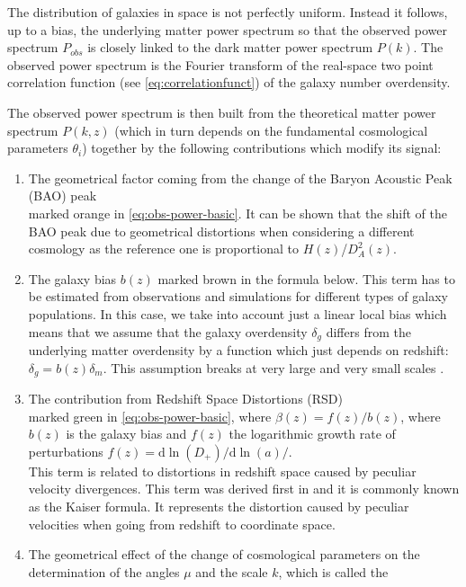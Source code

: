 The distribution of galaxies in space is not perfectly uniform. Instead it follows, up to a bias, the underlying
matter power spectrum so that the observed power spectrum $P_{obs}$ 
is closely linked to the dark matter power spectrum $P(k)$. The observed
power spectrum is the Fourier transform of the real-space two point correlation
function (see \cref{eq:correlationfunct}) of the galaxy number overdensity.

The observed power spectrum is then built from the theoretical matter power spectrum
$P(k,z)$ (which in turn depends on the fundamental cosmological parameters
$\theta_{i}$) together by the following contributions which modify its signal:

\begin{enumerate}
\item The geometrical factor coming from the change of the Baryon Acoustic Peak (BAO) peak \\ marked orange
in \cref{eq:obs-power-basic}. It can be shown \cite{cite some BAO review} that the 
shift of the BAO peak due to geometrical distortions when considering a different cosmology
as the reference one is proportional to $H(z)$/$D^2_{A}(z)$.
\item The galaxy bias $b(z)$ marked brown in the formula below.
This term has to be estimated from observations and simulations
for different types of galaxy populations. In this case, we take into account
just a linear local bias which means that we assume that the galaxy overdensity $\delta_g$ differs from the 
underlying matter overdensity by a function which just depends on redshift: $\delta_g = b(z) \delta_m$.
This assumption breaks at very large and very small scales \cite{cite some bias review}.
\item The contribution from Redshift Space Distortions (RSD) \\
marked green in \cref{eq:obs-power-basic}, where $\beta(z) = f(z)/b(z)$, where
$b(z)$ is the galaxy bias and $f(z)$ the logarithmic growth rate of perturbations $f(z)=\mathrm{d}\ln(D_+)/\mathrm{d}\ln(a)/$.\\
This term is related to distortions in redshift space caused by peculiar velocity divergences. This term was derived first in
\citep{kaiser_clustering_1987} and it is commonly known as the Kaiser formula.
It represents the distortion caused by peculiar velocities when going from redshift to 
coordinate space.
\item The geometrical effect of the change of cosmological parameters
on the determination of the angles $\mu$ and the scale $k$, which is called the

\end{enumerate}
